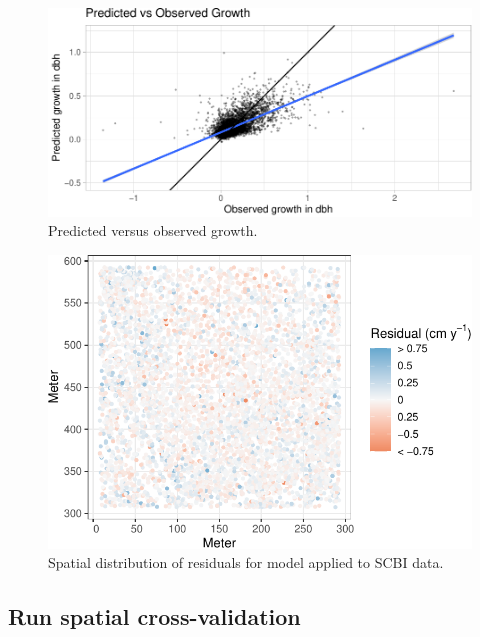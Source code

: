 \documentclass[12pt]{article}
\begin{document}
\begin{figure}

{\centering \includegraphics[width=1\linewidth]{Figures/scbi-model-residuals-1} 

}

\caption{Predicted versus observed growth.}\label{fig:scbi-model-residuals}
\end{figure}

\begin{figure}

{\centering \includegraphics[width=0.8\linewidth]{Figures/scbi-model-residuals-2-1} 

}

\caption{Spatial distribution of residuals for model applied to SCBI data.}\label{fig:scbi-model-residuals-2}
\end{figure}

\hypertarget{run-spatial-cross-validation}{%
\subsection{Run spatial
cross-validation}\label{run-spatial-cross-validation}}
\end{document}
